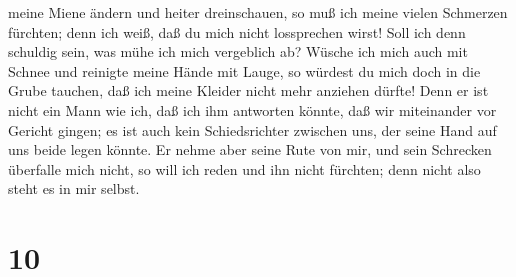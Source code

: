 meine Miene ändern und heiter dreinschauen,  so muß ich
meine vielen Schmerzen fürchten; denn ich weiß, daß du mich nicht
lossprechen wirst!  Soll ich denn schuldig sein, was mühe
ich mich vergeblich ab?  Wüsche ich mich auch mit Schnee
und reinigte meine Hände mit Lauge,  so würdest du mich
doch in die Grube tauchen, daß ich meine Kleider nicht mehr anziehen
dürfte!  Denn er ist nicht ein Mann wie ich, daß ich ihm
antworten könnte, daß wir miteinander vor Gericht gingen;
 es ist auch kein Schiedsrichter zwischen uns, der seine
Hand auf uns beide legen könnte.  Er nehme aber seine
Rute von mir, und sein Schrecken überfalle mich nicht, 
so will ich reden und ihn nicht fürchten; denn nicht also steht es in
mir selbst.

\hypertarget{section-9}{%
\section{10}\label{section-9}}

